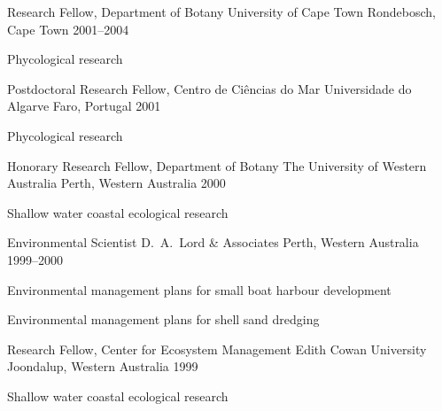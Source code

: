 \begin{cventries}

\cventry
{Research Fellow, Department of Botany} %
{University of Cape Town} %
{Rondebosch, Cape Town} %
{2001--2004} %
{ %
\begin{cvitems}
\item {Phycological research}
\end{cvitems} 
}


\cventry
{Postdoctoral Research Fellow, Centro de Ciências do Mar} %
{Universidade do Algarve} %
{Faro, Portugal} %
{2001} %
{ %
\begin{cvitems}
\item {Phycological research}
\end{cvitems} 
}


\cventry
{Honorary Research Fellow, Department of Botany} %
{The University of Western Australia} %
{Perth, Western Australia} %
{2000} %
{ %
\begin{cvitems}
\item {Shallow water coastal ecological research}
\end{cvitems} 
}


\cventry
{Environmental Scientist} %
{D.~A.~Lord \& Associates} %
{Perth, Western Australia} %
{1999--2000} %
{ %
\begin{cvitems}
\item {Environmental management plans for small boat harbour development}
\item {Environmental management plans for shell sand dredging}
\end{cvitems} 
}


\cventry
{Research Fellow, Center for Ecosystem Management} %
{Edith Cowan University} %
{Joondalup, Western Australia} %
{1999} %
{ %
\begin{cvitems}
\item {Shallow water coastal ecological research}
\end{cvitems} 
}


\end{cventries}